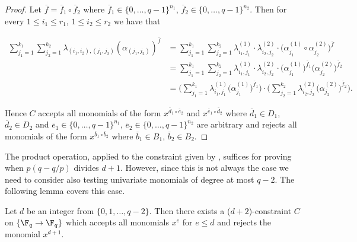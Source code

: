 \begin{proof}

Let $\overline f = \overline f_1 \circ \overline f_2$ where $\overline f_1 \in \{0,\ldots,q-1\}^{n_1}$, $\overline f_2 \in \{0,\ldots,q-1\}^{n_2}$.
Then for every $1 \leq i_1 \leq r_1$, $1 \leq i_2 \leq r_2$ we have that

\begin{align*}
\sum_{j_1=1}^{k_1} \sum_{j_2=1}^{k_2} \lambda_{(i_1,i_2),(j_1,j_2)} (\alpha_{(j_1,j_2)})^{\overline f} & = 
\sum_{j_1=1}^{k_1} \sum_{j_2=1}^{k_2}  \lambda^{(1)}_{i_1,j_1} \cdot \lambda^{(2)}_{i_2,j_2} \cdot \big(\alpha^{(1)}_{j_1} \circ  \alpha^{(2)}_{j_2}\big)^{\overline f} \\
& = \sum_{j_1=1}^{k_1} \sum_{j_2=1}^{k_2}  \lambda^{(1)}_{i_1,j_1} \cdot \lambda^{(2)}_{i_2,j_2} \cdot \big(\alpha^{(1)}_{j_1}\big)^{\overline f_1}  \big(\alpha^{(2)}_{j_2}\big)^{\overline f_2} \\
%
& =  \bigg( \sum_{j_1=1}^{k_1}\lambda^{(1)}_{i_1,j_1}  \big(\alpha^{(1)}_{j_1} \big)^{\overline f_1}\bigg) \cdot  \bigg( \sum_{j_2=1}^{k_2}\lambda^{(2)}_{i_2,j_2}  \big(\alpha^{(2)}_{j_2}\big)^{\overline f_2}\bigg).
\end{align*}

Hence $C$ accepts all monomials of the form $x^{\overline d_1 \circ  \overline e_2}$ and $x^{\overline e_1 \circ \overline d_2}$ where
$\overline d_1 \in D_1$, $\overline d_2 \in D_2$ and $\overline e_1 \in \{0,\ldots,q-1\}^{n_1}$, $\overline e_2 \in \{0,\ldots,q-1\}^{n_2}$ are arbitrary and
 rejects all monomials of the form $x^{\overline b_1 \circ \overline b_2}$ where $\overline b_1 \in B_1$, $\overline b_2 \in B_2$.
\end{proof}

The product operation, applied to the constraint given by , suffices for proving  when $p(q-q/p)$ divides $d+1$. However, since this is not always the case we need to consider also testing univariate monomials of degree at most $q-2$. The following lemma covers this case.

%
%

\begin{lemma}\label{lem:constraint-uni}
Let $d$ be an integer %
from
$\{0,1,\ldots ,q-2\}$. Then there exists a ($d+2$)-constraint $C$ on $\{\F_q \to \F_q\}$ which accepts all monomials
$x^e$ for $e \leq d$ and rejects the monomial $x^{d+1}$.
\end{lemma}

